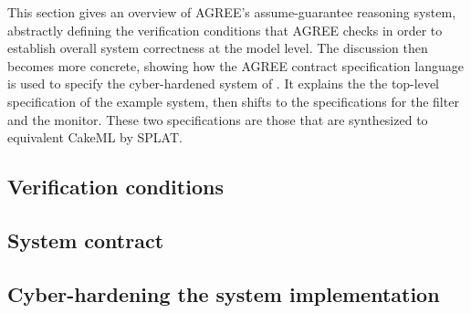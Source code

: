 This section gives an overview of AGREE's assume-guarantee reasoning
system, abstractly defining the verification conditions that AGREE
checks in order to establish overall system correctness at the model
level.  The discussion then becomes more concrete, showing how the
AGREE contract specification language is used to specify the
cyber-hardened system of . It explains the the
top-level specification of the example system, then shifts to the
specifications for the filter and the monitor.  These two
specifications are those that are synthesized to equivalent CakeML by
SPLAT.


\subsection{Verification conditions}


\subsection{System contract}


\subsection{Cyber-hardening the system implementation}

